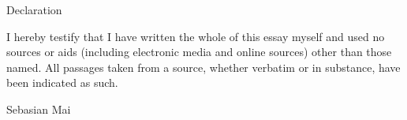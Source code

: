 
Declaration

I hereby testify that I have written the whole of this essay myself and used no sources or aids
(including electronic media and online sources) other than those named.
All passages taken from a source, whether verbatim or in substance, have been indicated as such.

Sebasian Mai

